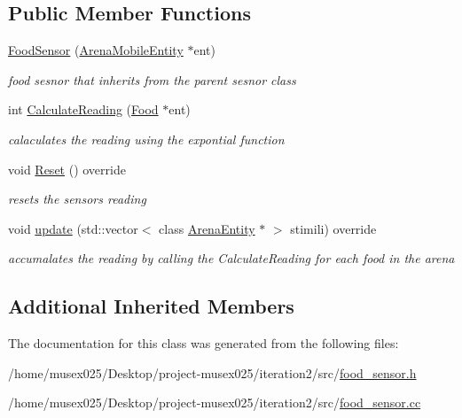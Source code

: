 \subsection*{Public Member Functions}
\begin{DoxyCompactItemize}
\item 
\hyperlink{classFoodSensor_a69a35d7061b547ef3140aa03d889b749}{Food\+Sensor} (\hyperlink{classArenaMobileEntity}{Arena\+Mobile\+Entity} $\ast$ent)\hypertarget{classFoodSensor_a69a35d7061b547ef3140aa03d889b749}{}\label{classFoodSensor_a69a35d7061b547ef3140aa03d889b749}

\begin{DoxyCompactList}\small\item\em food sesnor that inherits from the parent sesnor class \end{DoxyCompactList}\item 
int \hyperlink{classFoodSensor_a76e0a85b68b3fb3983d25c43673f37b7}{Calculate\+Reading} (\hyperlink{classFood}{Food} $\ast$ent)\hypertarget{classFoodSensor_a76e0a85b68b3fb3983d25c43673f37b7}{}\label{classFoodSensor_a76e0a85b68b3fb3983d25c43673f37b7}

\begin{DoxyCompactList}\small\item\em calaculates the reading using the expontial function \end{DoxyCompactList}\item 
void \hyperlink{classFoodSensor_a1b60ca32e66f68f2ca7ddd1d6d709764}{Reset} () override\hypertarget{classFoodSensor_a1b60ca32e66f68f2ca7ddd1d6d709764}{}\label{classFoodSensor_a1b60ca32e66f68f2ca7ddd1d6d709764}

\begin{DoxyCompactList}\small\item\em resets the sensors reading \end{DoxyCompactList}\item 
void \hyperlink{classFoodSensor_a9faf073eb425b425846a54cf502a7702}{update} (std\+::vector$<$ class \hyperlink{classArenaEntity}{Arena\+Entity} $\ast$ $>$ stimili) override\hypertarget{classFoodSensor_a9faf073eb425b425846a54cf502a7702}{}\label{classFoodSensor_a9faf073eb425b425846a54cf502a7702}

\begin{DoxyCompactList}\small\item\em accumalates the reading by calling the Calculate\+Reading for each food in the arena \end{DoxyCompactList}\end{DoxyCompactItemize}
\subsection*{Additional Inherited Members}


The documentation for this class was generated from the following files\+:\begin{DoxyCompactItemize}
\item 
/home/musex025/\+Desktop/project-\/musex025/iteration2/src/\hyperlink{food__sensor_8h}{food\+\_\+sensor.\+h}\item 
/home/musex025/\+Desktop/project-\/musex025/iteration2/src/\hyperlink{food__sensor_8cc}{food\+\_\+sensor.\+cc}\end{DoxyCompactItemize}
